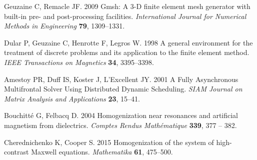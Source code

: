 \documentclass[%
 aip,
 amsmath,amssymb,
 reprint,%
]{revtex4-1}
\begin{document}
\begin{thebibliography}{99}
Geuzaine C, Remacle JF. 2009  Gmsh: {A} 3-{D} finite element mesh generator
  with built-in pre- and post-processing facilities. {\em International Journal
  for Numerical Methods in Engineering} \textbf{79}, 1309--1331.

Dular P, Geuzaine C, Henrotte F, Legros W. 1998  A general environment for the
  treatment of discrete problems and its application to the finite element
  method. {\em IEEE Transactions on Magnetics} \textbf{34}, 3395--3398.

Amestoy PR, Duff IS, Koster J, L'Excellent JY. 2001  A {Fully} {Asynchronous}
  {Multifrontal} {Solver} {Using} {Distributed} {Dynamic} {Scheduling}. {\em
  SIAM Journal on Matrix Analysis and Applications} \textbf{23}, 15--41.

Bouchitté G, Felbacq D. 2004  Homogenization near resonances and artificial
  magnetism from dielectrics. {\em Comptes Rendus Mathématique} \textbf{339},
  377 -- 382.

Cherednichenko K, Cooper S. 2015  Homogenization of the system of high-contrast
  {Maxwell} equations. {\em Mathematika} \textbf{61}, 475--500.

\end{thebibliography}


% 
% 
\end{document}
